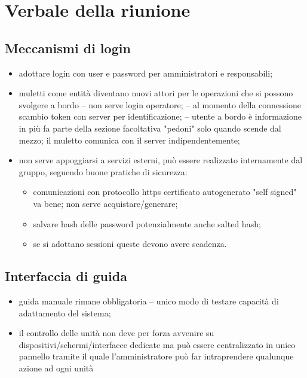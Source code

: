 \section{Verbale della riunione}

\subsection{Meccanismi di login}
\label{login}
    \begin{itemize}
        \item adottare login con user e password per amministratori e responsabili;
        \item muletti come entità diventano nuovi attori per le operazioni che si possono svolgere a bordo
            \subitem -- non serve login operatore;
            \subitem -- al momento della connessione scambio token con server per identificazione;
            \subitem -- utente a bordo è informazione in più
                \subsubitem * fa parte della sezione facoltativa "pedoni" solo quando scende dal mezzo;
                \subsubitem * il muletto comunica con il server indipendentemente;
        \item non serve appoggiarsi a servizi esterni, può essere realizzato internamente dal gruppo, seguendo buone pratiche di sicurezza:
            \begin{itemize}
                \item comunicazioni con protocollo https
                    \subitem * certificato autogenerato "self signed" va bene;
                    \subitem * non serve acquistare/generare;
                \item salvare hash delle password
                    \subitem * potenzialmente anche salted hash;
                \item se si adottano sessioni queste devono avere scadenza.
            \end{itemize}
    \end{itemize}

\subsection{Interfaccia di guida}
    \begin{itemize}
        \item guida manuale rimane obbligatoria
            \subitem -- unico modo di testare capacità di adattamento del sistema;
        \item il controllo delle unità non deve per forza avvenire su dispositivi/schermi/interfacce dedicate ma può essere centralizzato in unico pannello tramite il quale l'amministratore può far intraprendere qualunque azione ad ogni unità
    \end{itemize}

